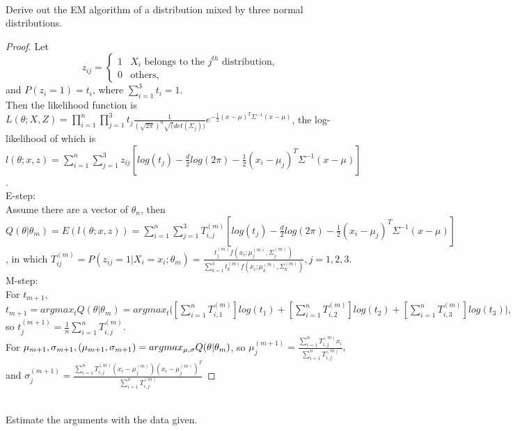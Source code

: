 \documentclass{article}
\newenvironment{problem}[2][Problem]{\begin{trivlist}
\item[\hskip \labelsep {\bfseries #1}\hskip \labelsep {\bfseries #2.}]}{\end{trivlist}}
\begin{document}
\begin{problem}{3}
\text{ } \\
Derive out the EM algorithm of a distribution mixed by three normal distributions.
\end{problem}
\begin{proof}
Let \[z_{ij} = \begin{cases} 
		1&\text{$X_{i}$ belongs to the $j^{th}$ distribution},\\ 
		0&\text{others},\end{cases}\] and $P(z_{i} = 1) = t_{i}$, where $\sum_{i=1}^{3}{t_{i}} = 1.$\\
Then the likelihood function is $L(\theta;X,Z) = \prod_{i=1}^{n}{\prod_{j=1}^{3}{t_{j}\frac{1}{(\sqrt{2\pi})^{n}\sqrt(det(\Sigma_{j}))}e^{-\frac{1}{2}(x-\mu)^{T}\Sigma^{-1}(x-\mu)}}}$, the log-likelihood of which is $l(\theta;x,z) = \sum_{i=1}^{n}{\sum_{j=1}^{3}{z_{ij}[log(t_{j})-\frac{d}{2}log(2\pi)-\frac{1}{2}(x_{i} - \mu_{j})^{T}\Sigma^{-1}(x-\mu)]}}$. \\
\quad E-step: \\
Assume there are a vector of $\theta_{n}$, then $Q(\theta|\theta_{m}) = E(l(\theta; x, z)) = \sum_{i=1}^{n}{\sum_{j=1}^{3}{T_{i,j}^{(m)}[log(t_{j})-\frac{d}{2}log(2\pi)-\frac{1}{2}(x_{i} - \mu_{j})^{T}\Sigma^{-1}(x-\mu)]}}$, in which $T_{ij}^{(m)} = P(z_{ij} = 1|X_{i} = x_{i}; \theta_{m}) = \frac{t_{j}^{(m)}f(x_{i}; \mu_{j}^{(m)},\Sigma_{j}^{(m)})}{\sum_{k=1}^{3}{t_{k}^{(m)}f(x_{i}; \mu_{k}^{(m)},\Sigma_{k}^{(m)})}}, j=1,2,3.$ \\
\quad M-step: \\
For $t_{m+1}$,\\ $t_{m+1} = argmax_{t}Q(\theta|\theta_{m}) = argmax_{t}\lgroup[\sum_{i=1}^{n}{T_{i, 1}^{(m)}}]log(t_1)+[\sum_{i=1}^{n}{T_{i, 2}^{(m)}}]log(t_2)+[\sum_{i=1}^{n}{T_{i, 3}^{(m)}}]log(t_3)\rgroup,$ so $t_{j}^{(m+1)} = \frac{1}{n}\sum_{i=1}^{n}{T_{i, j}^{(m)}}.$ \\
For $\mu_{m+1}, \sigma_{m+1}, \\(\mu_{m+1}, \sigma_{m+1}) = argmax_{\mu, \sigma}Q(\theta|\theta_{m})$, so $\mu_{j}^{(m+1)} = \frac{\sum_{i=1}^{n}{T_{i, j}^{(m)}}x_{i}}{\sum_{i=1}^{n}{T_{i, j}^{(m)}}},$ and $\sigma_{j}^{(m+1)} = \frac{\sum_{i=1}^{n}{T_{i, j}^{(m)}(x_{i} - \mu_{j}^{(m)})(x_{i} - \mu_{j}^{(m)})^{T}}}{\sum_{i=1}^{n}{T_{i, j}^{(m)}}}$
\end{proof}

\begin{problem}{4}
\text{ }\\
Estimate the arguments with the data given.
\end{problem}
\end{document}
